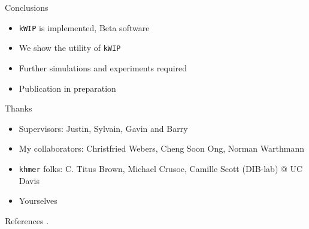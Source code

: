 \documentclass[t]{beamer}
\begin{document}
\begin{frame}{Conclusions}
  \begin{itemize}
    \item \texttt{kWIP} is implemented, Beta software
    \item We show the utility of \texttt{kWIP}
    \item Further simulations and experiments required
    \item Publication in preparation
  \end{itemize}
\end{frame}

\begin{frame}{Thanks}
  \begin{itemize}
    \item Supervisors: Justin, Sylvain, Gavin and Barry
    \item My collaborators: Christfried  Webers, Cheng Soon Ong, Norman Warthmann
    \item \texttt{khmer} folks: C. Titus Brown, Michael Crusoe, Camille Scott
          (DIB-lab) @ UC Davis
    \item Yourselves
  \end{itemize}
\end{frame}

\begin{frame}[shrink=20]{References}
  \printbibliography
  \vfill
  .
\end{frame}
\end{document}

